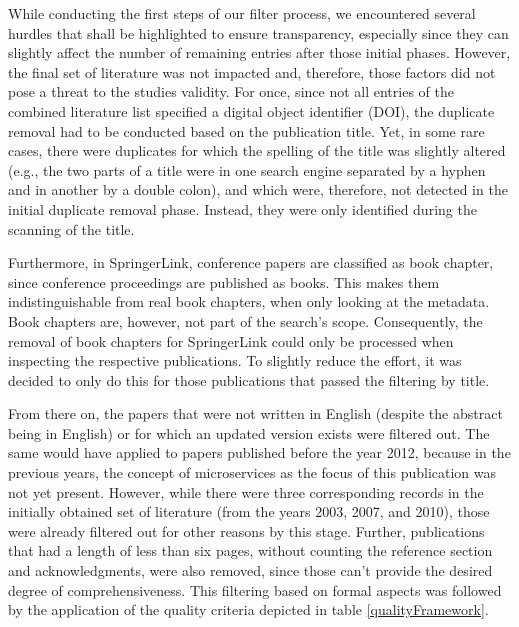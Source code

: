\documentclass[conference]{IEEEtran}
\begin{document}
While conducting the first steps of our filter process, we encountered several hurdles that shall be highlighted to ensure transparency, especially since they can slightly affect the number of remaining entries after those initial phases. However, the final set of literature was not impacted and, therefore, those factors did not pose a threat to the studies validity. For once, since not all entries of the combined literature list specified a digital object identifier (DOI), the duplicate removal had to be conducted based on the publication title. Yet, in some rare cases, there were duplicates for which the spelling of the title was slightly altered (e.g., the two parts of a title were in one search engine separated by a hyphen and in another by a double colon), and which were, therefore, not detected in the initial duplicate removal phase. Instead, they were only identified during the scanning of the title. 

Furthermore, in SpringerLink, conference papers are classified as book chapter, since conference proceedings are published as books. This makes them indistinguishable from real book chapters, when only looking at the metadata. Book chapters are, however, not part of the search’s scope. Consequently, the removal of book chapters for SpringerLink could only be processed when inspecting the respective publications. To slightly reduce the effort, it was decided to only do this for those publications that passed the filtering by title.

From there on, the papers that were not written in English (despite the abstract being in English) or for which an updated version exists were filtered out. The same would have applied to papers published before the year 2012, because in the previous years, the concept of microservices as the focus of this publication was not yet present. However, while there were three corresponding records in the initially obtained set of literature (from the years 2003, 2007, and 2010), those were already filtered out for other reasons by this stage. Further, publications that had a length of less than six pages, without counting the reference section and acknowledgments, were also removed, since those can’t provide the desired degree of comprehensiveness. This filtering based on formal aspects was followed by the application of the quality criteria depicted in table \ref{qualityFramework}.
\end{document}
